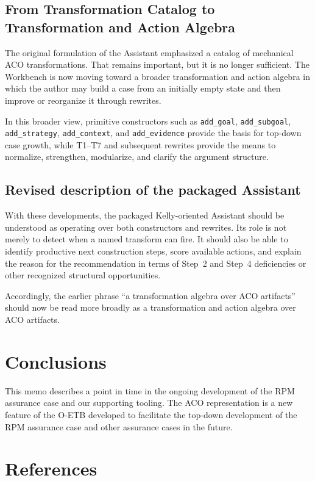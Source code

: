 \documentclass{article}
\begin{document}
\subsection{From Transformation Catalog to Transformation and Action Algebra}

The original formulation of the Assistant emphasized a catalog of mechanical ACO transformations. That remains important, but it is no longer sufficient. The Workbench is now moving toward a broader transformation and action algebra in which the author may build a case from an initially empty state and then improve or reorganize it through rewrites.

In this broader view, primitive constructors such as \texttt{add\_goal}, \texttt{add\_subgoal}, \texttt{add\_strategy}, \texttt{add\_context}, and \texttt{add\_evidence} provide the basis for top-down case growth, while T1--T7 and subsequent rewrites provide the means to normalize, strengthen, modularize, and clarify the argument structure.

\subsection{Revised description of the packaged Assistant}

With these developments, the packaged Kelly-oriented Assistant should be understood as operating over both constructors and rewrites. Its role is not merely to detect when a named transform can fire. It should also be able to identify productive next construction steps, score available actions, and explain the reason for the recommendation in terms of Step~2 and Step~4 deficiencies or other recognized structural opportunities.

Accordingly, the earlier phrase ``a transformation algebra over ACO artifacts'' should now be read more broadly as a transformation and action algebra over ACO artifacts.

\clearpage
\section{Conclusions}\label{sed:concl}
This memo describes a point in time in the ongoing development of the RPM assurance case and our supporting tooling.
The ACO representation is a new feature of the O-ETB developed to facilitate the top-down development of the RPM assurance case and other assurance cases in the future.

\clearpage
\section{References}\label{sec:refs}
\end{document}
